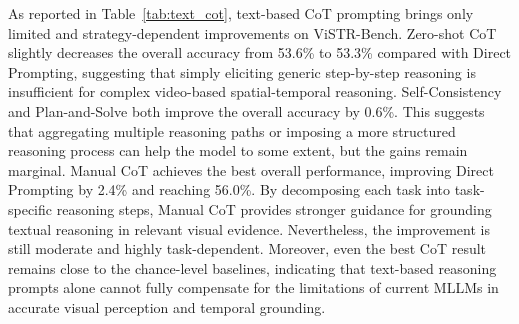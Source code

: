 As reported in Table~\ref{tab:text_cot}, text-based CoT prompting brings only limited and strategy-dependent improvements on ViSTR-Bench.
Zero-shot CoT slightly decreases the overall accuracy from 53.6\% to 53.3\% compared with Direct Prompting, suggesting that simply eliciting generic step-by-step reasoning is insufficient for complex video-based spatial-temporal reasoning.
Self-Consistency and Plan-and-Solve both improve the overall accuracy by 0.6\%.
This suggests that aggregating multiple reasoning paths or imposing a more structured reasoning process can help the model to some extent, but the gains remain marginal.
Manual CoT achieves the best overall performance, improving Direct Prompting by 2.4\% and reaching 56.0\%.
By decomposing each task into task-specific reasoning steps, Manual CoT provides stronger guidance for grounding textual reasoning in relevant visual evidence.
Nevertheless, the improvement is still moderate and highly task-dependent.
Moreover, even the best CoT result remains close to the chance-level baselines, indicating that text-based reasoning prompts alone cannot fully compensate for the limitations of current MLLMs in accurate visual perception and temporal grounding.

